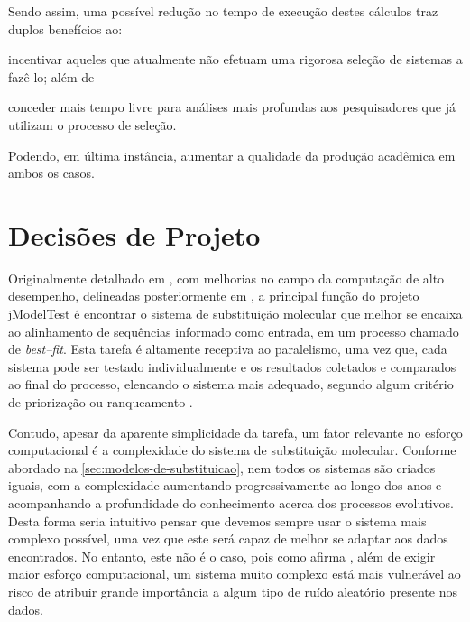 \documentclass[english,brazilian]{UNISINOSmonografia} %
\begin{document}
Sendo assim, uma possível redução no tempo de execução destes cálculos traz duplos benefícios ao: 
\begin{inparaenum} 
	\item incentivar aqueles que atualmente não efetuam uma rigorosa seleção de sistemas a fazê-lo; além de 
	\item conceder mais tempo livre para análises mais profundas aos pesquisadores que já utilizam o processo de seleção.
\end{inparaenum}
Podendo, em última instância, aumentar a qualidade da produção acadêmica em ambos os casos.


\section{Decisões de Projeto}
\label{sec:modelo-decisoes}




Originalmente detalhado em , com melhorias no campo da computação de alto desempenho, delineadas posteriormente em , a principal função do projeto jModelTest é encontrar o sistema de substituição molecular que melhor se encaixa ao alinhamento de sequências informado como entrada, em um processo chamado de \textit{best--fit}.
Esta tarefa é altamente receptiva ao paralelismo, uma vez que, cada sistema pode ser testado individualmente e os resultados coletados e comparados ao final do processo, elencando o sistema mais adequado, segundo algum critério de priorização ou ranqueamento \cite{Keane2006a}.


Contudo, apesar da aparente simplicidade da tarefa, um fator relevante no esforço computacional é a complexidade do sistema de substituição molecular.
Conforme abordado na \autoref{sec:modelos-de-substituicao}, nem todos os sistemas são criados iguais, com a complexidade aumentando progressivamente ao longo dos anos e acompanhando a profundidade do conhecimento acerca dos processos evolutivos.
Desta forma seria intuitivo pensar que devemos sempre usar o sistema mais complexo possível, uma vez que este será capaz de melhor se adaptar aos dados encontrados. 
No entanto, este não é o caso, pois como afirma , além de exigir maior esforço computacional, um sistema muito complexo está mais vulnerável ao risco de atribuir grande importância a algum tipo de ruído aleatório presente nos dados.
\end{document}
